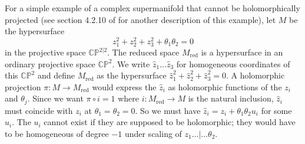 \documentclass[11pt,a4paper]{article}
\def\hat{\widehat}
\def\red{{\mathrm{red}}}
\def\CP{{\mathbb{CP}}}
\def\h{\widehat}
\begin{document}
For a simple example of a complex supermanifold that cannot be 
holomorphically projected  (see section 4.2.10 of \cite{Manin} for another description 
of this example), let $M$ be the hypersurface
\begin{equation}\label{hypersurface}z_1^2+z_2^2+z_3^2 +\theta_1\theta_2=0\end{equation}
in the projective space $\CP^{2|2}$. The reduced space $M_\red$ is a 
hypersurface in an ordinary projective space $\CP^2$. We write
$\hat z_1\dots \hat z_3$  for homogeneous coordinates of this $\CP^2$ and 
define $M_\red$ as the hypersurface $\h z_1^2+\h z_2^2+\h z _3^2=0$.
A holomorphic projection $\pi:M\to M_\red$ would express the $\hat z_i$ as 
holomorphic functions of the $z_i$ and $\theta_j$.  Since we want $\pi\circ i=1$ where
$i:M_\red\to M$ is the natural inclusion, $\hat z_i$ must coincide with 
$z_i$ at $\theta_1=\theta_2=0$.  So we must have 
$\hat z_i=z_i+\theta_1\theta_2 u_i$ for some $u_i$. The
$u_i$ cannot exist if they are supposed to be holomorphic;  
they would have to  be homogeneous of degree $-1$ under scaling of $z_1\dots|\dots\theta_2$.
\end{document}
